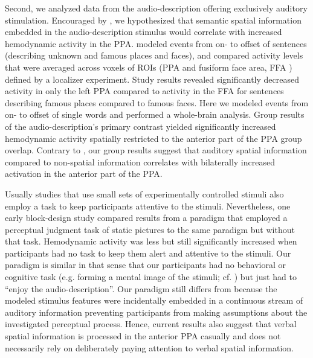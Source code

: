 \documentclass[english]{article}
\begin{document}
Second, we analyzed data from the audio-description offering exclusively
auditory stimulation.
Encouraged by \citep{aziz2008modulation}, we hypothesized that semantic spatial
information embedded in the audio-description stimulus would correlate with
increased hemodynamic activity in the PPA.
\citep{aziz2008modulation} modeled events from on- to offset of sentences
(describing unknown and famous places and faces), and compared activity levels
that were averaged across voxels of ROIs (PPA and fusiform face area, FFA
\citep{kanwisher1997ffa}) defined by a localizer experiment.
Study results revealed significantly decreased activity in only the left PPA
compared to activity in the FFA for sentences describing famous places compared
to famous faces.
Here we modeled events from on- to offset of single words and performed a
whole-brain analysis.
Group results of the audio-description's primary contrast yielded significantly
increased hemodynamic activity spatially restricted to the anterior part of the
PPA group overlap.
Contrary to \citep{aziz2008modulation}, our group results suggest that auditory
spatial information compared to non-spatial information correlates with
bilaterally increased activation in the anterior part of the PPA.

Usually studies that use small sets of experimentally controlled stimuli also
employ a task to keep participants attentive to the stimuli.
Nevertheless, one early block-design study \citep{epstein1998ppa} compared
results from a paradigm that employed a perceptual judgment task of static
pictures to the same paradigm but without that task.
Hemodynamic activity was less but still significantly increased when
participants had no task to keep them alert and attentive to the stimuli.
Our paradigm is similar in that sense that our participants had no behavioral or
cognitive task (e.g. forming a mental image of the stimuli; cf.
\citep{ocraven2000mental})  but just had to ``enjoy the audio-description''.
Our paradigm still differs from \citep{epstein1998ppa} because the modeled
stimulus features were incidentally embedded in a continuous stream of auditory
information preventing participants from making assumptions about the
investigated perceptual process.
Hence, current results also suggest that verbal spatial information is processed
in the anterior PPA casually and does not necessarily rely on deliberately
paying attention to verbal spatial information.
\end{document}
